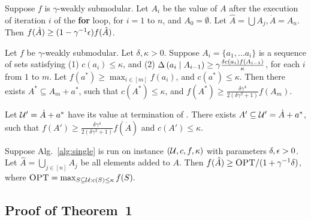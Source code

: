 \begin{proposition} \label{prop:ahat-adot}
  Suppose $f$ is $\gamma$-weakly submodular.
  Let $A_i$ be the value of $A$ after the execution of iteration $i$ of the \textbf{for} loop,
  for $i = 1$ to $n$, and $A_0 = \emptyset$.
  Let $\hat A = \bigcup A_j, \dot A = A_n$. Then $f( \dot A ) \ge (1 - \gamma^{-1} \epsilon )f( \hat A)$.
\end{proposition}

\begin{lemma} \label{lemma:value-inside-A}
  Let $f$ be $\gamma$-weakly submodular.
  Let $\delta, \kappa > 0$. Suppose $A_i = \{ a_1, \ldots a_i \}$ is a sequence of sets satisfying
  (1) $c(a_i) \le \kappa$, and (2) $\Delta \left(  a_i  \mid  A_{i - 1}  \right) \ge \gamma \frac{\delta c( a_i ) f( A_{i -1 } ) }{ \kappa }$,
  for each $i$ from $1$ to $m$. Let $f( a^* ) \ge \max_{i \in [m]} f(a_i)$, and $c(a^*) \le \kappa$.
  Then there exists $A^* \subseteq A_m + a^*$, such that $c( A^* ) \le \kappa$, and
  $f( A^* ) \ge \frac{ \delta \gamma^4}{2(\delta\gamma^2 + 1)} f(A_m)$.
\end{lemma}

\begin{proposition} \label{prop:aprime}
  Let $\mathcal{U}' = \dot A + a^*$ have its value at termination of \qss.
  There exists $A' \subseteq \mathcal{U}' = \dot A + a^*$, such that $f(A') \ge \frac{\delta \gamma^4}{2(\delta \gamma^2 + 1)} f(\dot A )$
  and $c(A') \le \kappa$.
\end{proposition}

\begin{proposition} \label{prop:opt-ahat}
  Suppose Alg.~\ref{alg:single} is run on instance $(\mathcal{U},c,f,\kappa )$ with
  parameters $\delta, \epsilon > 0$.
  Let $\hat A = \bigcup_{j \in [n]} A_j$ be all elements added to $A$.
  Then $f( \hat A ) \ge \textsc{OPT} / (1 + \gamma^{-1}\delta )$, where $\textsc{OPT} = \max_{S \subseteq \mathcal{U}: c(S) \le \kappa } f(S).$
\end{proposition}

\subsection{Proof of Theorem~1}

